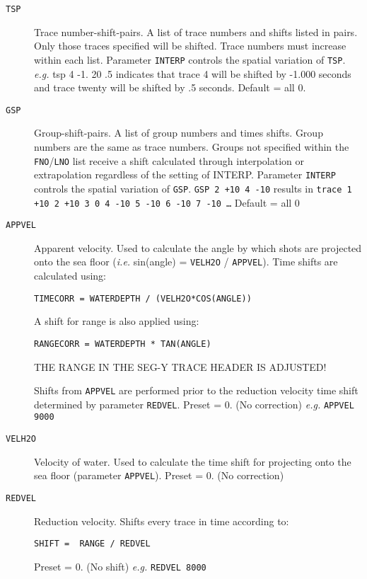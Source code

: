 \begin{description}
\item[\texttt{TSP}] Trace number-shift-pairs.  A list of trace numbers and shifts
         listed in pairs.  Only those traces specified will be shifted.
         Trace numbers must increase within each list.  Parameter \texttt{INTERP}
         controls the spatial variation of \texttt{TSP}.
         \textit{e.g.} tsp 4 -1. 20 .5 indicates that trace 4 will be shifted by
         -1.000 seconds and trace twenty will be shifted by .5 seconds.
         Default = all 0.

\item[\texttt{GSP}] Group-shift-pairs.  A list of group numbers and times shifts.
         Group numbers are the same as trace numbers.  Groups not
         specified within the \texttt{FNO}/\texttt{LNO} list receive a shift calculated
         through interpolation or extrapolation regardless of the
         setting of INTERP.  Parameter \texttt{\texttt{INTERP}} controls the spatial
         variation of \texttt{GSP}.
         \texttt{GSP 2 +10 4 -10} results in \texttt{trace 1 +10 2 +10 3 0 4 -10 5 -10 6
               -10 7 -10 \ldots}
         Default = all 0

\item[\texttt{APPVEL}] Apparent velocity.  Used to calculate the angle by which \glspl{shot}
         are projected onto the sea floor
         (\textit{i.e.} sin(angle) = \texttt{VELH2O} / \texttt{APPVEL}).
         Time shifts are calculated using:
\begin{verbatim}
TIMECORR = WATERDEPTH / (VELH2O*COS(ANGLE))
\end{verbatim}
         A shift for range is also applied using:
\begin{verbatim}
RANGECORR = WATERDEPTH * TAN(ANGLE)
\end{verbatim}
         THE RANGE IN THE SEG-Y TRACE HEADER IS ADJUSTED!

         Shifts from \texttt{APPVEL} are performed prior to the reduction
         velocity time shift determined by parameter \texttt{REDVEL}.
         Preset = 0. (No correction)    \textit{e.g.}   \texttt{APPVEL 9000}

\item[\texttt{VELH2O}] Velocity of water.  Used to calculate the time shift for
         projecting onto the sea floor (parameter \texttt{APPVEL}).
         Preset = 0.  (No correction)

\item[\texttt{REDVEL}] Reduction velocity.  Shifts every trace in time according to:
\begin{verbatim}
SHIFT =  RANGE / REDVEL
\end{verbatim}
         Preset = 0. (No shift)    \textit{e.g.} \texttt{REDVEL 8000}


\end{description}
